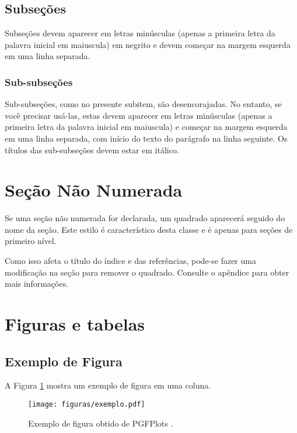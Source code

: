  \subsection{Subseções}

Subseções devem aparecer em letras minúsculas (apenas a primeira letra da palavra inicial em maiuscula) em negrito e devem começar na margem esquerda em uma linha separada.

\subsubsection{Sub-subseções}

Sub-subseções, como no presente subitem, são desencorajadas. No entanto, se você precisar usá-las, estas devem aparecer em letras minúsculas (apenas a primeira letra da palavra inicial em maiuscula) e começar na margem esquerda em uma linha separada, com início do texto do parágrafo na linha seguinte. Os títulos das sub-subseções devem estar em itálico.

\section*{Seção Não Numerada} \label{sec:unsec}

    Se uma seção não numerada for declarada, um quadrado aparecerá seguido do nome da seção. Este estilo é característico desta classe e é apenas para seções de primeiro nível.

    Como isso afeta o título do índice e das referências, pode-se fazer uma modificação na seção   para remover o quadrado. Consulte o apêndice para obter mais informações.


\section{Figuras e tabelas}

    \subsection{Exemplo de Figura}

        A Figura \ref{fig:figura3} mostra um exemplo de figura em uma coluna.
        
            \begin{figure}[htb]
                \centering
                \caption{Exemplo de figura obtido de PGFPlots \cite{PFGPlots}.}
                \texttt{[image: figuras/exemplo.pdf]}
                \label{fig:figura3}
                
                
            \end{figure}

